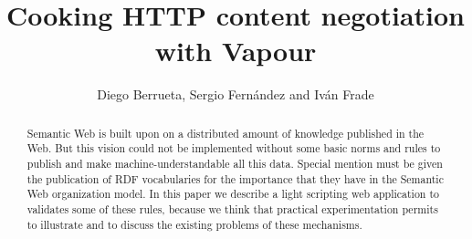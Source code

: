 \documentclass{../templates/llncs}
\begin{document}

\title{Cooking HTTP content negotiation with Vapour}



\author{Diego Berrueta, Sergio Fern\'andez and Iv\'an Frade}


\maketitle

\begin{abstract}
Semantic Web is built upon on a distributed amount of knowledge published in the 
Web. But this vision could not be implemented without some basic norms and rules 
to publish and make machine-understandable all this data. Special mention must be
given the publication of RDF vocabularies for the importance that they have in 
the Semantic Web organization model. In this paper we describe a light scripting 
web application to validates some of these rules, because we think that practical 
experimentation permits to illustrate and to discuss the existing problems of these
mechanisms.
\end{abstract}




\end{document}
